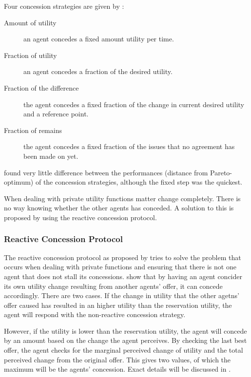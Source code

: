 Four concession strategies are given by \citet{wu2009efficient}: 
\begin{description}
	\item[Amount of utility] an agent concedes a fixed amount utility per time. 
	\item[Fraction of utility] an agent concedes a fraction of the desired utility. 
	\item[Fraction of the difference] the agent concedes a fixed fraction of the change in current desired utility and a reference point. 
	\item[Fraction of remains] the agent concedes a fixed fraction of the issues that no agreement has been made on yet. \end{description} 
\citet{wu2009efficient} found very little difference between the performances (distance from Pareto-optimum) of the concession strategies, although the fixed step was the quickest. 

\begin{definition*}
	
\end{definition*}
When dealing with private utility functions matter change completely. There is no way knowing whether the other agents has conceded. A solution to this is proposed by \citet{zheng2015automated} using the reactive concession protocol.

\subsubsection{Reactive Concession Protocol}
The reactive concession protocol as proposed by \citet{zheng2015automated} tries to solve the problem that occurs when dealing with private functions and ensuring that there is not one agent that does not stall its concessions. \citet{zheng2015automated} show that by having an agent concider its own utility change resulting from another agents' offer, it can concede accordingly. There are two cases. If the change in utility that the other agetns' offer caused has resulted in an higher utility than the reservation utility, the agent will respond with the non-reactive concession strategy. 

However, if the utility is lower than the reservation utility, the agent will concede by an amount based on the change the agent perceives. By checking the last best offer, the agent checks for the marginal perceived change of utility and the total perceived change from the original offer. This gives two values, of which the maximum will be the agents' concession. Exact details will be discussed in .


